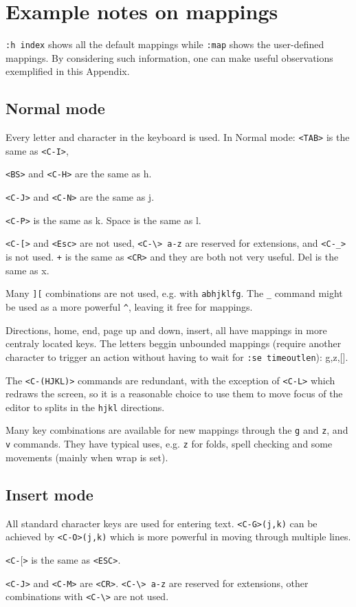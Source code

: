 \documentclass{article}
\newcommand{\ttt}[1] {
	\texttt{<#1>}}
\newcommand{\tttt}[1]{\texttt{#1}}
\begin{document}
\section{Example notes on mappings}\label{notes}
\texttt{:h index} shows all the default mappings
while \tttt{:map} shows the user-defined mappings.
By considering such information, one can make
useful observations exemplified in this Appendix.

\subsection{Normal mode}
Every letter and character in the keyboard is used.
In Normal mode: \ttt{TAB} is the same as \ttt{C-I},
\ttt{BS} and \ttt{C-H} are the same as h.
\ttt{C-J} and \ttt{C-N} are the same as j.
\ttt{C-P} is the same as k.
Space is the same as l.
\ttt{C-[} and \ttt{Esc} are not used,
\tttt{<C-\textbackslash> a-z} are reserved for extensions,
and \ttt{C-\_} is not used.
\tttt{+} is the same as \ttt{CR} and they are both not very useful.
Del is the same as x.

Many \tttt{][} combinations are not used, e.g.
with \tttt{abhjklfg}.
The \tttt{\_} command might be used as a more powerful \tttt{\^},
leaving it free for mappings.

Directions, home, end, page up and down, insert, all have mappings
in more centraly located keys.
The letters beggin unbounded mappings (require another character to
trigger an action without having to wait for \tttt{:se timeoutlen}): g,z,[].

The \ttt{C-(HJKL)} commands are redundant,
with the exception of \ttt{C-L} which redraws the screen,
so it is a reasonable choice to use them to move focus
of the editor to splits in the \tttt{hjkl} directions.

Many key combinations are available for new mappings through the \tttt{g}
and \tttt{z}, and \tttt{v} commands.
They have typical uses, e.g. \tttt{z} for folds,
spell checking and some movements (mainly when wrap is set).

\subsection{Insert mode}
All standard character keys are used for entering text.
\tttt{<C-G>(j,k)} can be achieved by \tttt{<C-O>(j,k)} which is more powerful
in moving through multiple lines.
\ttt{C-$[$} is the same as \ttt{ESC}.
\ttt{C-J} and \ttt{C-M} are \ttt{CR}.
\tttt{<C-\textbackslash> a-z} are reserved for extensions,
other combinations with \ttt{C-\textbackslash} are not used.
\end{document}
